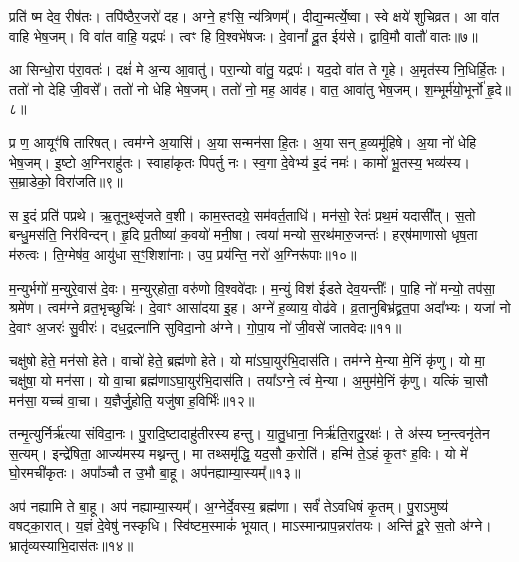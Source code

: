 प्रति॑ ष्म देव॒ रीष॑तः।
तपि॑ष्ठैर॒जरो॑ दह।
अग्ने॒ हꣳसि॒ न्य॑त्रिणम्᳚।
दीद्य॒न्मर्त्ये॒ष्वा।
स्वे क्षये॑ शुचिव्रत।
आ वा॑त वाहि भेष॒जम्।
वि वा॑त वाहि॒ यद्रपः॑।
त्वꣳ हि वि॒श्वभे॑षजः।
दे॒वानां᳚ दू॒त ईय॑से।
द्वावि॒मौ वातौ॑ वातः॥७॥\ip

आ सिन्धो॒रा प॑रा॒वतः॑।
दक्षं॑ मे अ॒न्य आ॒वातु॑।
परा॒न्यो वा॑तु॒ यद्रपः॑।
यद॒दो वा॑त ते गृ॒हे।
अ॒मृत॑स्य नि॒धिर्\mbox{}हि॒तः।
ततो॑ नो देहि जी॒वसे᳚।
ततो॑ नो धेहि भेष॒जम्।
ततो॑ नो॒ मह॒ आव॑ह।
वात॒ आवा॑तु भेष॒जम्।
श॒म्भूर्म॑यो॒भूर्नो॑ हृ॒दे॥८॥\ip

प्र ण॒ आयूꣳ॑षि तारिषत्।
त्वम॑ग्ने अ॒यासि॑।
अ॒या सन्मन॑सा हि॒तः।
अ॒या सन् ह॒व्यमू॑हिषे।
अ॒या नो॑ धेहि भेष॒जम्।
इ॒ष्टो अ॒ग्निराहु॑तः।
स्वाहा॑कृतः पिपर्तु नः।
स्व॒गा दे॒वेभ्य॑ इ॒दं नमः॑।
कामो॑ भू॒तस्य॒ भव्य॑स्य।
स॒म्राडेको॒ विरा॑जति॥९॥\ip

स इ॒दं प्रति॑ पप्रथे।
ऋ॒तूनुथ्सृ॑जते व॒शी।
काम॒स्तदग्रे॒ सम॑वर्त॒ताधि॑।
मन॑सो॒ रेतः॑ प्रथ॒मं यदासी᳚त्।
स॒तो बन्धु॒मस॑ति॒ निर॑विन्दन्।
हृ॒दि प्र॒तीष्या॑ क॒वयो॑ मनी॒षा।
त्वया॑ मन्यो स॒रथ॑मारु॒जन्तः॑।
हर्‌\mbox{}ष॑माणासो धृष॒ता म॑रुत्वः।
ति॒ग्मेष॑व॒ आयु॑धा स॒ꣳ॒शिशा॑नाः।
उप॒ प्रय॑न्ति॒ नरो॑ अ॒ग्निरू॑पाः॥१०॥\ip

म॒न्युर्भगो॑ म॒न्युरे॒वास॑ दे॒वः।
म॒न्युर्‌\mbox{}होता॒ वरु॑णो वि॒श्ववे॑दाः।
म॒न्युं विश॑ ईडते देव॒यन्तीः᳚।
पा॒हि नो॑ मन्यो॒ तप॑सा॒ श्रमे॑ण।
त्वम॑ग्ने व्रत॒भृच्छुचिः॑।
दे॒वाꣳ आसा॑दया इ॒ह।
अग्ने॑ ह॒व्याय॒ वोढ॑वे।
व्र॒तानुबिभ्र॑द्व्रत॒पा अदा᳚भ्यः।
यजा॑ नो दे॒वाꣳ अ॒जरः॑ सु॒वीरः॑।
दध॒द्रत्ना॑नि सुविदा॒नो अ॑ग्ने।
गो॒पा॒य नो॑ जी॒वसे॑ जातवेदः॥११॥\ip\anuvakamend[जिघाꣳ॑सत्य॒मित्रा᳚ञ्जघ॒न्वानी॑डते॒ सर्वा॒ अꣳह॑सो वातो हृ॒दे रा॑जत्य॒ग्निरू॑पाः सुविदा॒नो अ॑ग्न॒ एकं॑ च]

चक्षु॑षो हेते॒ मन॑सो हेते।
वाचो॑ हेते॒ ब्रह्म॑णो हेते।
यो मा॑\-ऽघा॒युर॑भि॒दास॑ति।
तम॑ग्ने मे॒न्या मे॒निं कृ॑णु।
यो मा॒ चक्षु॑षा॒ यो मन॑सा।
यो वा॒चा ब्रह्म॑णा\-ऽघा॒युर॑भि॒दास॑ति।
तया᳚ऽग्ने॒ त्वं मे॒न्या।
अ॒मुम॑मे॒निं कृ॑णु।
यत्किं चा॒सौ मन॑सा॒ यच्च॑ वा॒चा।
य॒ज्ञैर्जु॒होति॒ यजु॑षा ह॒विर्भिः॑॥१२॥\ip

तन्मृ॒त्युर्निर्\mbox{}ऋ॑त्या संविदा॒नः।
पु॒रादि॒ष्टादाहु॑तीरस्य हन्तु।
या॒तु॒धाना॒ निर्\mbox{}ऋ॑ति॒रादु॒रक्षः॑।
ते अ॑स्य घ्न॒न्त्वनृ॑तेन स॒त्यम्।
इन्द्रे॑षिता॒ आज्य॑मस्य मथ्नन्तु।
मा तथ्समृ॑द्धि॒ यद॒सौ क॒रोति॑।
हन्मि॑ ते॒ऽहं कृ॒तꣳ ह॒विः।
यो मे॑ घो॒रमची॑कृतः।
अपा᳚ञ्चौ त उ॒भौ बा॒हू।
अप॑नह्याम्या॒स्यम्᳚॥१३॥\ip

अप॑ नह्यामि ते बा॒हू।
अप॑ नह्याम्या॒स्यम्᳚।
अ॒ग्नेर्दे॒वस्य॒ ब्रह्म॑णा।
सर्वं॑ तेऽवधिषं कृ॒तम्।
पु॒रा\-ऽमुष्य॑ वषट्का॒रात्।
य॒ज्ञं दे॒वेषु॑ नस्कृधि।
स्वि॑ष्टम॒स्माकं॑ भूयात्।
माऽस्मान्प्राप॒न्न\-रा॑तयः।
अन्ति॑ दू॒रे स॒तो अ॑ग्ने।
भ्रातृ॑व्यस्याभि॒दास॑तः॥१४॥\ip

